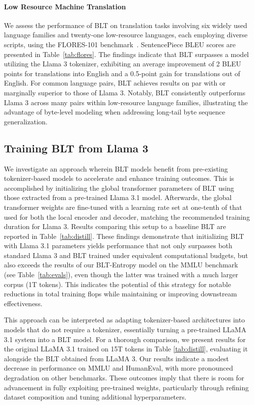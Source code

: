 \paragraph{Low Resource Machine Translation} We assess the performance of {\textsc BLT} on translation tasks involving six widely used language families and twenty-one low-resource languages, each employing diverse scripts, using the FLORES-101 benchmark~\citep{goyal2022flores}. SentencePiece BLEU scores are presented in Table~\ref{tab:flores}.
The findings indicate that {\textsc BLT} surpasses a model utilizing the Llama 3 tokenizer, exhibiting an average improvement of 2 BLEU points for translations into English and a 0.5-point gain for translations out of English. For common language pairs, {\textsc BLT} achieves results on par with or marginally superior to those of Llama 3. Notably, {\textsc BLT} consistently outperforms Llama 3 across many pairs within low-resource language families, illustrating the advantage of byte-level modeling when addressing long-tail byte sequence generalization.

\subsection{Training {\textsc BLT} from Llama 3}
\label{sec:distillation}
We investigate an approach wherein {\textsc BLT} models benefit from pre-existing tokenizer-based models to accelerate and enhance training outcomes. This is accomplished by initializing the global transformer parameters of {\textsc BLT} using those extracted from a pre-trained Llama 3.1 model. Afterwards, the global transformer weights are fine-tuned with a learning rate set at one-tenth of that used for both the local encoder and decoder, matching the recommended training duration for Llama 3. Results comparing this setup to a baseline {\textsc BLT} are reported in Table~\ref{tab:distill}. These findings demonstrate that initializing {\textsc BLT} with Llama 3.1 parameters yields performance that not only surpasses both standard Llama 3 and {\textsc BLT} trained under equivalent computational budgets, but also exceeds the results of our {\textsc BLT}-Entropy model on the MMLU benchmark (see Table~\ref{tab:evals}), even though the latter was trained with a much larger corpus (1T tokens). This indicates the potential of this strategy for notable reductions in total training flops while maintaining or improving downstream effectiveness.

This approach can be interpreted as adapting tokenizer-based architectures into models that do not require a tokenizer, essentially turning a pre-trained LLaMA 3.1 system into a {\textsc BLT} model. For a thorough comparison, we present results for the original LLaMA 3.1 trained on 15T tokens in Table \ref{tab:distill}, evaluating it alongside the {\textsc BLT} obtained from LLaMA 3. Our results indicate a modest decrease in performance on MMLU and HumanEval, with more pronounced degradation on other benchmarks. These outcomes imply that there is room for advancement in fully exploiting pre-trained weights, particularly through refining dataset composition and tuning additional hyperparameters.

